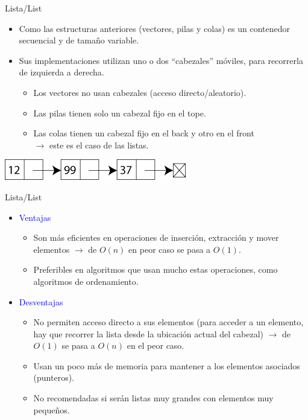 \documentclass{beamer} %
\newcommand{\blue}[1]{\textcolor{blue}{#1}}
\begin{document}
\begin{frame}{Lista/List}
    \begin{itemize}
        \item Como las estructuras anteriores (vectores, pilas y colas) es un contenedor secuencial y de tamaño variable.
        \item Sus implementaciones utilizan uno o dos ``cabezales'' móviles, para recorrerla de izquierda a derecha.
        \begin{itemize}
            \item Los vectores no usan cabezales (acceso directo/aleatorio).
            \item Las pilas tienen solo un cabezal fijo en el tope.
            \item Las colas tienen un cabezal fijo en el back y otro en el front\\$\to$ este es el caso de las listas.
        \end{itemize}
    \end{itemize}
    \begin{center}
        \includegraphics[width=.5\textwidth]{./image/cap2/list.png}
    \end{center}
\end{frame}

\begin{frame}{Lista/List}
    \begin{itemize}
        \item<1-> \blue{Ventajas}
        \begin{itemize}
            \item Son más eficientes en operaciones de inserción, extracción y mover elementos $\to$ de $O(n)$ en peor caso se pasa a $O(1)$.
            \item Preferibles en algoritmos que usan mucho estas operaciones, como algoritmos de ordenamiento.
        \end{itemize}
        \item<2-> \blue{Desventajas}
        \begin{itemize}
            \item No permiten acceso directo a sus elementos (para acceder a un elemento, hay que recorrer la lista desde la ubicación actual del cabezal) $\to$ de $O(1)$ se pasa a $O(n)$ en el peor caso.
            \item Usan un poco más de memoria para mantener a los elementos asociados (punteros).
            \item No recomendadas si serán listas muy grandes con elementos muy pequeños.
        \end{itemize}
    \end{itemize}
\end{frame}
\end{document}
